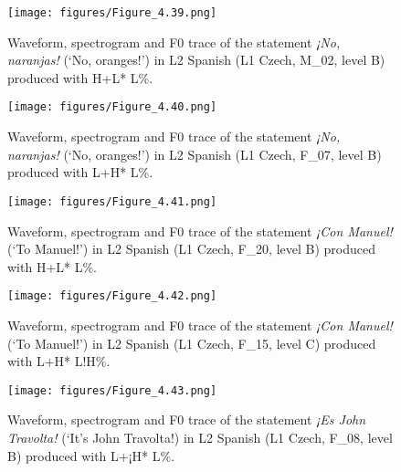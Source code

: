 \begin{figure}


\texttt{[image: figures/Figure\_4.39.png]}


\caption{Waveform, spectrogram and F0 trace of the statement \textit{¡No, naranjas!} (‘No, oranges!’) in L2 Spanish (L1 Czech, M\_02, level B) produced with H+L* L\%.}
\label{fig:4.39}
\end{figure}

\begin{figure}


\texttt{[image: figures/Figure\_4.40.png]}


\caption{Waveform, spectrogram and F0 trace of the statement \textit{¡No, naranjas!} (‘No, oranges!’) in L2 Spanish (L1 Czech, F\_07, level B) produced with L+H* L\%.}
\label{fig:4.40}
\end{figure}

\begin{figure}


\texttt{[image: figures/Figure\_4.41.png]}


\caption{Waveform, spectrogram and F0 trace of the statement \textit{¡Con Manuel!} (‘To Manuel!’) in L2 Spanish (L1 Czech, F\_20, level B) produced with H+L* L\%.}
\label{fig:4.41}
\end{figure}

\begin{figure}


\texttt{[image: figures/Figure\_4.42.png]}


\caption{Waveform, spectrogram and F0 trace of the statement \textit{¡Con Manuel!} (‘To Manuel!’) in L2 Spanish (L1 Czech, F\_15, level C) produced with L+H* L!H\%.}
\label{fig:4.42}
\end{figure}

\begin{figure}


\texttt{[image: figures/Figure\_4.43.png]}


\caption{Waveform, spectrogram and F0 trace of the statement \textit{¡Es John Travolta!} (‘It’s John Travolta!) in L2 Spanish (L1 Czech, F\_08, level B) produced with L+¡H* L\%.}
\label{fig:4.43}
\end{figure}

